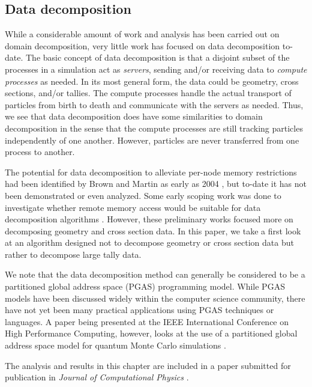 \subsection{Data decomposition}

While a considerable amount of work and analysis has been carried out on domain
decomposition, very little work has focused on data decomposition to-date. The
basic concept of data decomposition is that a disjoint subset of the processes
in a simulation act as \emph{servers}, sending and/or receiving data to
\emph{compute processes} as needed. In its most general form, the data could be
geometry, cross sections, and/or tallies. The compute processes handle the
actual transport of particles from birth to death and communicate with the
servers as needed. Thus, we see that data decomposition does have some
similarities to domain decomposition in the sense that the compute processes are
still tracking particles independently of one another. However, particles are
never transferred from one process to another.

The potential for data decomposition to alleviate per-node memory restrictions
had been identified by Brown and Martin as early as 2004
\cite{trans-brown-2004}, but to-date it has not been demonstrated or even
analyzed. Some early scoping work was done to investigate whether remote memory
access would be suitable for data decomposition algorithms
\cite{pnst-romano-2011}. However, these preliminary works focused more on
decomposing geometry and cross section data. In this paper, we take a first look
at an algorithm designed not to decompose geometry or cross section data but
rather to decompose large tally data.

We note that the data decomposition method can generally be considered to be a
partitioned global address space (PGAS) programming model. While PGAS models
have been discussed widely within the computer science community, there have not
yet been many practical applications using PGAS techniques or languages. A paper
being presented at the IEEE International Conference on High Performance
Computing, however, looks at the use of a partitioned global address space model
for quantum Monte Carlo simulations \cite{hipc-niu-2012}.

The analysis and results in this chapter are included in a paper submitted for
publication in \emph{Journal of Computational Physics} \cite{jcp-romano-2013}.

